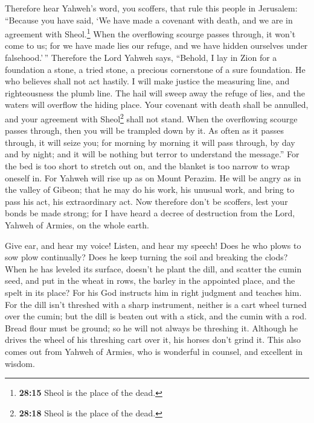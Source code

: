  Therefore hear Yahweh's word, you scoffers, that rule
this people in Jerusalem:  ``Because you have said, `We
have made a covenant with death, and we are in agreement with
Sheol.\footnote{\textbf{28:15} Sheol is the place of the dead.} When the
overflowing scourge passes through, it won't come to us; for we have
made lies our refuge, and we have hidden ourselves under falsehood.'\,''
 Therefore the Lord Yahweh says, ``Behold, I lay in Zion
for a foundation a stone, a tried stone, a precious cornerstone of a
sure foundation. He who believes shall not act hastily. 
I will make justice the measuring line, and righteousness the plumb
line. The hail will sweep away the refuge of lies, and the waters will
overflow the hiding place.  Your covenant with death
shall be annulled, and your agreement with Sheol\footnote{\textbf{28:18}
  Sheol is the place of the dead.} shall not stand. When the overflowing
scourge passes through, then you will be trampled down by it.
 As often as it passes through, it will seize you; for
morning by morning it will pass through, by day and by night; and it
will be nothing but terror to understand the message.'' 
For the bed is too short to stretch out on, and the blanket is too
narrow to wrap oneself in.  For Yahweh will rise up as on
Mount Perazim. He will be angry as in the valley of Gibeon; that he may
do his work, his unusual work, and bring to pass his act, his
extraordinary act.  Now therefore don't be scoffers, lest
your bonds be made strong; for I have heard a decree of destruction from
the Lord, Yahweh of Armies, on the whole earth.

 Give ear, and hear my voice! Listen, and hear my speech!
 Does he who plows to sow plow continually? Does he keep
turning the soil and breaking the clods?  When he has
leveled its surface, doesn't he plant the dill, and scatter the cumin
seed, and put in the wheat in rows, the barley in the appointed place,
and the spelt in its place?  For his God instructs him in
right judgment and teaches him.  For the dill isn't
threshed with a sharp instrument, neither is a cart wheel turned over
the cumin; but the dill is beaten out with a stick, and the cumin with a
rod.  Bread flour must be ground; so he will not always
be threshing it. Although he drives the wheel of his threshing cart over
it, his horses don't grind it.  This also comes out from
Yahweh of Armies, who is wonderful in counsel, and excellent in wisdom.

